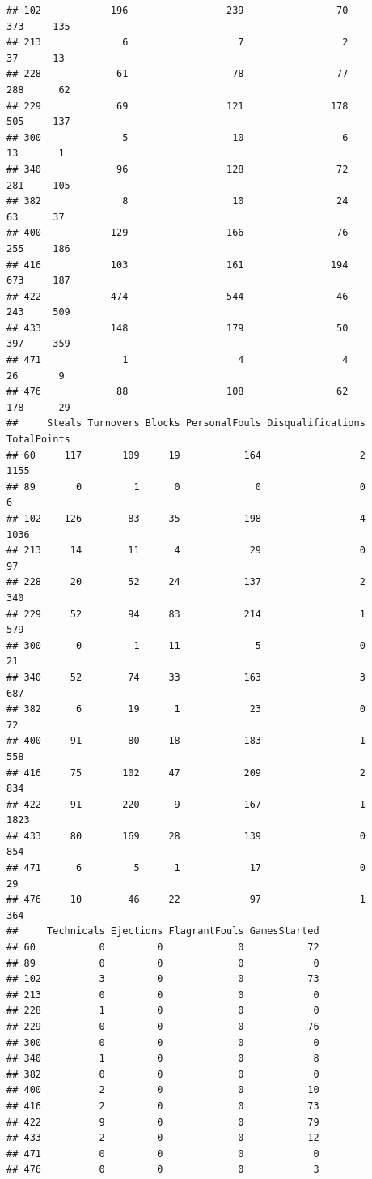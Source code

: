 \documentclass[]{book}
\theoremstyle{definition}
\theoremstyle{definition}
\theoremstyle{remark}
\begin{document}
\begin{verbatim}
## 102            196                 239                70           373     135
## 213              6                   7                 2            37      13
## 228             61                  78                77           288      62
## 229             69                 121               178           505     137
## 300              5                  10                 6            13       1
## 340             96                 128                72           281     105
## 382              8                  10                24            63      37
## 400            129                 166                76           255     186
## 416            103                 161               194           673     187
## 422            474                 544                46           243     509
## 433            148                 179                50           397     359
## 471              1                   4                 4            26       9
## 476             88                 108                62           178      29
##     Steals Turnovers Blocks PersonalFouls Disqualifications TotalPoints
## 60     117       109     19           164                 2        1155
## 89       0         1      0             0                 0           6
## 102    126        83     35           198                 4        1036
## 213     14        11      4            29                 0          97
## 228     20        52     24           137                 2         340
## 229     52        94     83           214                 1         579
## 300      0         1     11             5                 0          21
## 340     52        74     33           163                 3         687
## 382      6        19      1            23                 0          72
## 400     91        80     18           183                 1         558
## 416     75       102     47           209                 2         834
## 422     91       220      9           167                 1        1823
## 433     80       169     28           139                 0         854
## 471      6         5      1            17                 0          29
## 476     10        46     22            97                 1         364
##     Technicals Ejections FlagrantFouls GamesStarted
## 60           0         0             0           72
## 89           0         0             0            0
## 102          3         0             0           73
## 213          0         0             0            0
## 228          1         0             0            0
## 229          0         0             0           76
## 300          0         0             0            0
## 340          1         0             0            8
## 382          0         0             0            0
## 400          2         0             0           10
## 416          2         0             0           73
## 422          9         0             0           79
## 433          2         0             0           12
## 471          0         0             0            0
## 476          0         0             0            3
\end{verbatim}
\end{document}
